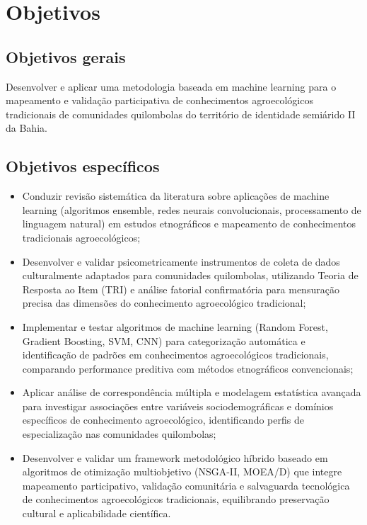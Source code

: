 \section{Objetivos}
\subsection{Objetivos gerais}

Desenvolver e aplicar uma metodologia baseada em machine learning para o mapeamento e validação participativa de conhecimentos agroecológicos tradicionais de comunidades quilombolas do território de identidade semiárido II da Bahia.

\subsection{Objetivos específicos}

\begin{itemize}
    \item Conduzir revisão sistemática da literatura sobre aplicações de machine learning (algoritmos ensemble, redes neurais convolucionais, processamento de linguagem natural) em estudos etnográficos e mapeamento de conhecimentos tradicionais agroecológicos;
    
    \item Desenvolver e validar psicometricamente instrumentos de coleta de dados culturalmente adaptados para comunidades quilombolas, utilizando Teoria de Resposta ao Item (TRI) e análise fatorial confirmatória para mensuração precisa das dimensões do conhecimento agroecológico tradicional;
    
    \item Implementar e testar algoritmos de machine learning (Random Forest, Gradient Boosting, SVM, CNN) para categorização automática e identificação de padrões em conhecimentos agroecológicos tradicionais, comparando performance preditiva com métodos etnográficos convencionais;
    
    \item Aplicar análise de correspondência múltipla e modelagem estatística avançada para investigar associações entre variáveis sociodemográficas e domínios específicos de conhecimento agroecológico, identificando perfis de especialização nas comunidades quilombolas;
    
    \item Desenvolver e validar um framework metodológico híbrido baseado em algoritmos de otimização multiobjetivo (NSGA-II, MOEA/D) que integre mapeamento participativo, validação comunitária e salvaguarda tecnológica de conhecimentos agroecológicos tradicionais, equilibrando preservação cultural e aplicabilidade científica.
    
\end{itemize}

